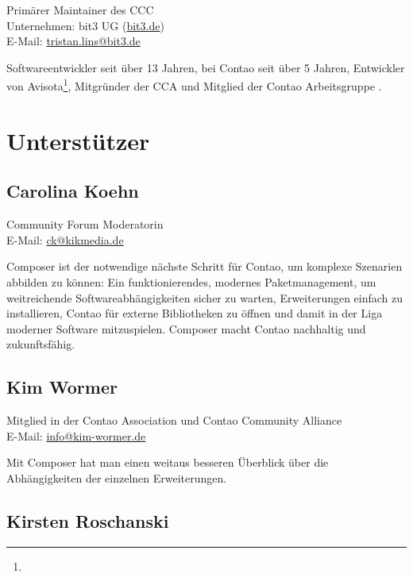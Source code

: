 \documentclass[
paper=a4,
draft=false,%
fontsize=10pt%
]{scrartcl}
\begin{document}
Primärer Maintainer des CCC \\
Unternehmen: bit3 UG (\href{https://bit3.de}{bit3.de}) \\
E-Mail: \href{mailto:tristan.lins@bit3.de}{tristan.lins@bit3.de}

Softwareentwickler seit über 13 Jahren, bei Contao seit über 5 Jahren, Entwickler von Avisota\footnote{}, Mitgründer der CCA und Mitglied der Contao Arbeitsgruppe .

\newpage

%
%

\section{Unterstützer}
\label{sec:backers}

\subsection*{Carolina  Koehn}

Community Forum Moderatorin \\
E-Mail: \href{mailto:ck@kikmedia.de}{ck@kikmedia.de}

Composer ist der notwendige nächste Schritt für Contao, um komplexe Szenarien abbilden zu können: Ein funktionierendes, modernes  Paketmanagement, um weitreichende Softwareabhängigkeiten sicher zu warten, Erweiterungen einfach zu installieren, Contao für externe Bibliotheken zu öffnen und damit in der Liga moderner Software mitzuspielen. Composer macht Contao nachhaltig und zukunftsfähig.

\subsection*{Kim  Wormer}

Mitglied in der Contao Association und Contao Community Alliance \\
E-Mail: \href{mailto:info@kim-wormer.de}{info@kim-wormer.de}

Mit Composer hat man einen weitaus besseren Überblick über die Abhängigkeiten der einzelnen Erweiterungen.

\subsection*{Kirsten  Roschanski}
\end{document}
